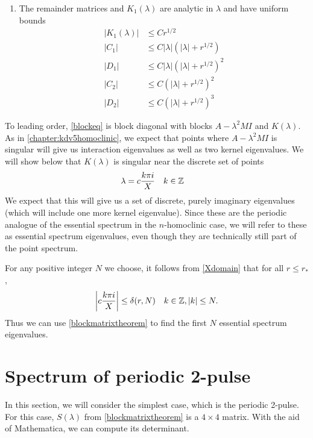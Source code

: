 \documentclass[thesis.tex]{subfiles}
\begin{document}
\begin{theorem}
\begin{enumerate}
\item The remainder matrices and $K_1(\lambda)$ are analytic in $\lambda$ and have uniform bounds
\begin{align*}
|K_1(\lambda)| &\leq C r^{1/2} \\
|C_1| &\leq C |\lambda|(|\lambda| + r^{1/2}) \\
|D_1| &\leq C |\lambda|(|\lambda| + r^{1/2})^2 \\
|C_2| &\leq C (|\lambda| + r^{1/2})^2 \\
|D_2| &\leq C (|\lambda| + r^{1/2})^3 
\end{align*}
\end{enumerate}
\end{theorem}

To leading order, \cref{blockeq} is block diagonal with blocks $A - \lambda^2 MI$ and $K(\lambda)$. As in \cref{chapter:kdv5homoclinic}, we expect that points where $A - \lambda^2 MI$ is singular will give us interaction eigenvalues as well as two kernel eigenvalues. We will show below that $K(\lambda)$ is singular near the discrete set of points
\begin{align*}
\lambda &= c\frac{k \pi i}{X} && k \in \mathbb{Z}
\end{align*}
We expect that this will give us a set of discrete, purely imaginary eigenvalues (which will include one more kernel eigenvalue). Since these are the periodic analogue of the essential spectrum in the $n$-homoclinic case, we will refer to these as essential spectrum eigenvalues, even though they are technically still part of the point spectrum. 

\begin{remark}
For any positive integer $N$ we choose, it follows from \cref{Xdomain} that for all $r \leq r_*$,
\begin{align*}
\left| c\frac{k \pi i}{X} \right| \leq \delta(r,N) && k \in \mathbb{Z}, |k|\leq N.
\end{align*}
Thus we can use \cref{blockmatrixtheorem} to find the first $N$ essential spectrum eigenvalues.
\end{remark}

\section{Spectrum of periodic 2-pulse}

In this section, we will consider the simplest case, which is the periodic 2-pulse. For this case, $S(\lambda)$ from \cref{blockmatrixtheorem} is a $4\times4$ matrix. With the aid of Mathematica, we can compute its determinant.
\end{document}
